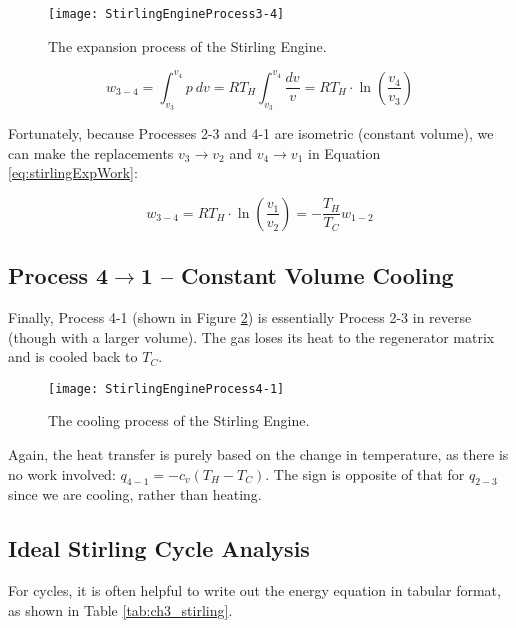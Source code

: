 \begin{figure}[H]
\centering
\texttt{[image: StirlingEngineProcess3-4]}
\caption{The expansion process of the Stirling Engine.}
\label{fig:ch3_stirling34}
\end{figure}

\begin{equation} \label{eq:stirlingExpWork}
  w_{3-4} = \int_{v_3}^{v_4} p\:dv= R T_H \int_{v_3}^{v_4} \frac{dv}{v}=RT_H\cdot  \ln\left(\frac{v_4}{v_3}\right)
\end{equation}

Fortunately, because Processes 2-3 and 4-1 are isometric (constant volume), we can make the replacements $v_3 \rightarrow v_2$ and $v_4\rightarrow v_1$ in Equation \ref{eq:stirlingExpWork}:

\begin{equation}
  w_{3-4} = RT_H \cdot \ln\left(\frac{v_1}{v_2}\right) = - \frac{T_H}{T_C} w_{1-2}
\end{equation}
\newpage
\subsection{Process 4$\rightarrow$1 -- Constant Volume Cooling}

Finally, Process 4-1 (shown in Figure \ref{fig:ch3_stirling41}) is essentially Process 2-3 in reverse (though with a larger volume).  The gas loses its heat to the regenerator matrix and is cooled back to $T_C$.

\begin{figure}[H]
\centering
\texttt{[image: StirlingEngineProcess4-1]}
\caption{The cooling process of the Stirling Engine.}
\label{fig:ch3_stirling41}
\end{figure}

Again, the heat transfer is purely based on the change in temperature, as there is no work involved: $q_{4-1} = -c_v (T_H-T_C)$.  The sign is opposite of that for $q_{2-3}$ since we are cooling, rather than heating.

\subsection{Ideal Stirling Cycle Analysis}
For cycles, it is often helpful to write out the energy equation in tabular format, as shown in Table \ref{tab:ch3_stirling}.

